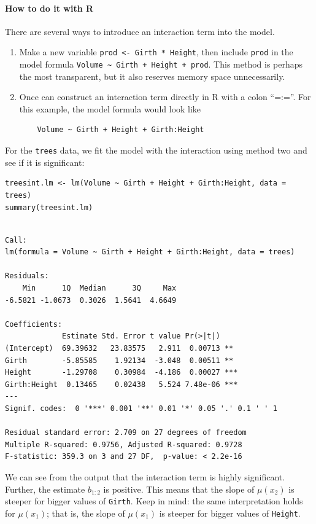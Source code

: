 \documentclass[captions=tableheading]{scrbook}
\begin{document}
\paragraph*{How to do it with \textsf{R}}

There are several ways to introduce an interaction term into the model.
\begin{enumerate}
\item Make a new variable \texttt{prod <- Girth * Height}, then include \texttt{prod} in the model formula \texttt{Volume \textasciitilde{} Girth + Height + prod}. This method is perhaps the most transparent, but it also reserves memory space unnecessarily.
\item Once can construct an interaction term directly in \textsf{R} with a colon ``=:=''. For this example, the model formula would look like 
\begin{verbatim}
    Volume ~ Girth + Height + Girth:Height
\end{verbatim}
\end{enumerate}

For the \texttt{trees} data, we fit the model with the interaction using method two and see if it is significant:


\begin{verbatim}
treesint.lm <- lm(Volume ~ Girth + Height + Girth:Height, data = trees)
summary(treesint.lm)
\end{verbatim}


\begin{verbatim}

Call:
lm(formula = Volume ~ Girth + Height + Girth:Height, data = trees)

Residuals:
    Min      1Q  Median      3Q     Max 
-6.5821 -1.0673  0.3026  1.5641  4.6649 

Coefficients:
             Estimate Std. Error t value Pr(>|t|)    
(Intercept)  69.39632   23.83575   2.911  0.00713 ** 
Girth        -5.85585    1.92134  -3.048  0.00511 ** 
Height       -1.29708    0.30984  -4.186  0.00027 ***
Girth:Height  0.13465    0.02438   5.524 7.48e-06 ***
---
Signif. codes:  0 '***' 0.001 '**' 0.01 '*' 0.05 '.' 0.1 ' ' 1 

Residual standard error: 2.709 on 27 degrees of freedom
Multiple R-squared: 0.9756,	Adjusted R-squared: 0.9728 
F-statistic: 359.3 on 3 and 27 DF,  p-value: < 2.2e-16
\end{verbatim}

We can see from the output that the interaction term is highly significant. Further, the estimate $b_{1:2}$ is positive. This means that the slope of $\mu(x_{2})$ is steeper for bigger values of \texttt{Girth}. Keep in mind: the same interpretation holds for $\mu(x_{1})$; that is, the slope of $\mu(x_{1})$ is steeper for bigger values of \texttt{Height}.
\end{document}
